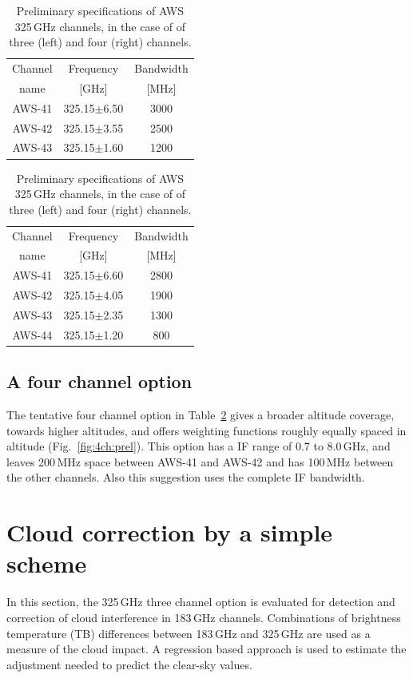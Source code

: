 \documentclass[12pt]{article}
\begin{document}
\begin{table}[!t]
  \begin{minipage}[b]{0.5\linewidth}
  \centering  
  \begin{tabular}[c]{c|c|c}
    Channel & Frequency   & Bandwidth \\
    name    & [GHz] &  [MHz] \\
    \hline
    AWS-41  & 325.15$\pm$6.50 & 3000\\
    AWS-42  & 325.15$\pm$3.55 & 2500\\
    AWS-43  & 325.15$\pm$1.60 & 1200\\
    \hline
  \end{tabular}
  \end{minipage}%
  \begin{minipage}[b]{0.5\linewidth}
  \centering  
  \begin{tabular}[c]{c|c|c}
    Channel & Frequency   & Bandwidth \\
    name    & [GHz] &  [MHz] \\
    \hline
    AWS-41  & 325.15$\pm$6.60 & 2800\\
    AWS-42  & 325.15$\pm$4.05 & 1900\\
    AWS-43  & 325.15$\pm$2.35 & 1300\\
    AWS-44  & 325.15$\pm$1.20 & \phantom{0}800\\
    \hline
  \end{tabular}
  \end{minipage}  
  \caption{Preliminary specifications of AWS 325\,GHz channels, in the case of
    of three (left) and four (right) channels.}
  \label{tab:chs:prel}
\end{table}




\subsection{A four channel option}
%
The tentative four channel option in Table~\ref{tab:chs:prel} gives a broader
altitude coverage, towards higher altitudes, and offers weighting functions
roughly equally spaced in altitude (Fig.~\ref {fig:4ch:prel}). This option has
a IF range of 0.7 to 8.0\,GHz, and leaves 200\,MHz space between AWS-41 and
AWS-42 and has 100\,MHz between the other channels. Also this suggestion uses
the complete IF bandwidth.


\section{Cloud correction by a simple scheme}
\label{sec:simple}
%
In this section, the 325\,GHz three channel option is evaluated for detection
and correction of cloud interference in 183\,GHz channels. Combinations of
brightness temperature (TB) differences between 183\,GHz and 325\,GHz are used
as a measure of the cloud impact. A regression based approach is used to
estimate the adjustment needed to predict the clear-sky values.
\end{document}
